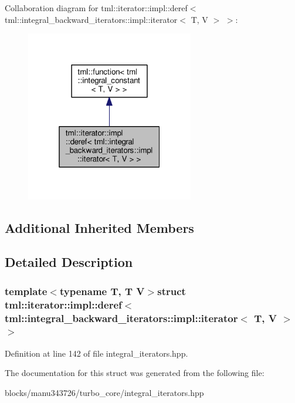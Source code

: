 Collaboration diagram for tml\+:\+:iterator\+:\+:impl\+:\+:deref$<$ tml\+:\+:integral\+\_\+backward\+\_\+iterators\+:\+:impl\+:\+:iterator$<$ T, V $>$ $>$\+:
\nopagebreak
\begin{figure}[H]
\begin{center}
\leavevmode
\includegraphics[width=208pt]{structtml_1_1iterator_1_1impl_1_1deref_3_01tml_1_1integral__backward__iterators_1_1impl_1_1itera2121585b2861780c4a5cb45235f43769}
\end{center}
\end{figure}
\subsection*{Additional Inherited Members}


\subsection{Detailed Description}
\subsubsection*{template$<$typename T, T V$>$struct tml\+::iterator\+::impl\+::deref$<$ tml\+::integral\+\_\+backward\+\_\+iterators\+::impl\+::iterator$<$ T, V $>$ $>$}



Definition at line 142 of file integral\+\_\+iterators.\+hpp.



The documentation for this struct was generated from the following file\+:\begin{DoxyCompactItemize}
\item 
blocks/manu343726/turbo\+\_\+core/integral\+\_\+iterators.\+hpp\end{DoxyCompactItemize}
